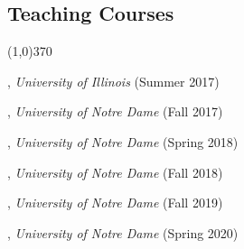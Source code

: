 \documentclass[10pt]{article}
\newenvironment{myindentpar}[1]%
{\begin{list}{}%
         {\setlength{\leftmargin}{#1}}%
         \item[]%
}
{\end{list}}
\newcounter{list}
\newcommand{\hide}[1]{}
\begin{document}
\subsection{\sc Teaching Courses}
\vspace{-0.4cm} \line(1,0){370} \vspace{-0.1cm}

\begin{myindentpar}{0.75cm}

\hspace{-0.75cm}{\bf CS 412 Introduction to Data Mining}, \emph{University of Illinois} (Summer 2017)
	
\hspace{-0.75cm}{\bf CSE 40647/60647 Data Science}, \emph{University of Notre Dame} (Fall 2017)

\hspace{-0.75cm}{\bf CSE 40647/60647 Data Science}, \emph{University of Notre Dame} (Spring 2018)

\hspace{-0.75cm}{\bf CSE 40647/60647 Data Science}, \emph{University of Notre Dame} (Fall 2018)

\hspace{-0.75cm}{\bf CSE 40647/60647 Data Science}, \emph{University of Notre Dame} (Fall 2019)

\hspace{-0.75cm}{\bf CSE 60326 Computational Behavior Modeling}, \emph{University of Notre Dame} (Spring 2020)

\end{myindentpar}

\hide{
\subsection{\sc Media Coverage}
\vspace{-0.4cm} \line(1,0){370} \vspace{-0.1cm}

\begin{myindentpar}{0.75cm}
{\em With modern media, press coverage sometimes spreads far and wide. There are often more outlets reporting than can be captured. This section therefore lists only a representative article (or two) of the total press coverage.}

\hspace{-0.75cm} XXX (XXX 2019) 
\hspace{0.75cm}{\em XXX}

\hspace{-0.75cm} XXX (XXX 2019) 

\url{https://www.XXX.com/}

\end{myindentpar}
}
\end{document}
